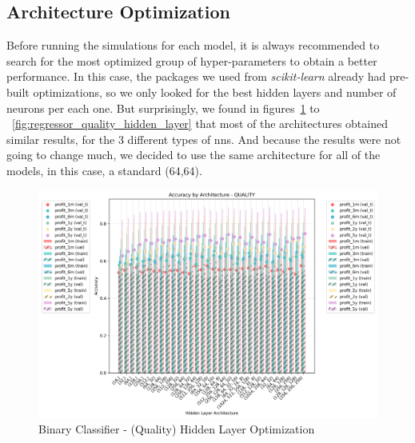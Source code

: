 \documentclass[11pt,english,a4paper,hidelinks]{book}
\begin{document}
\subsection{Architecture Optimization}

Before running the simulations for each model, it is always recommended to search for the most optimized group of hyper-parameters to obtain a better performance. In this case, the packages we used from \textit{scikit-learn} already had pre-built optimizations, so we only looked for the best hidden layers and number of neurons per each one. But surprisingly, we found in figures~\ref{fig:binary_quality_hidden_layer} to ~\ref{fig:regressor_quality_hidden_layer} that most of the architectures obtained similar results, for the 3 different types of \acrshort{nn}s. And because the results were not going to change much, we decided to use the same architecture for all of the models, in this case, a standard (64,64).

\begin{figure}[H]
    \centering
    \includegraphics[width=1\textwidth]{images/code/models/neural_network/binary_classifier_nn/class_architecture_analysis_quality.png}
    \caption{Binary Classifier - (Quality) Hidden Layer Optimization}
    \label{fig:binary_quality_hidden_layer}
\end{figure}
\end{document}
